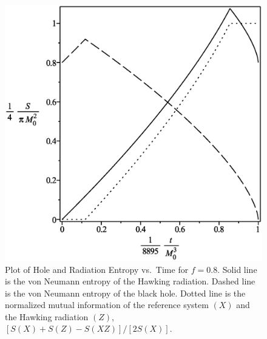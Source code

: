 \documentclass[12pt]{article}
\begin{document}
\begin{figure}[H]
\centering
\includegraphics[width=1\textwidth]{Hawking-hole-radiation-mutual-entropy-vs-time-graph-10f-is-8.eps}
\caption{Plot of Hole and Radiation Entropy vs.\ Time for $f=0.8$.
Solid line is the von Neumann entropy of the Hawking radiation.
Dashed line is the von Neumann entropy of the black hole.
Dotted line is the normalized mutual information of the reference system $(X)$ and the Hawking radiation $(Z)$, $[S(X)+S(Z)-S(XZ)]/[2S(X)]$.}
\end{figure}
\end{document}
